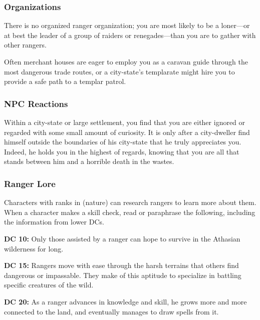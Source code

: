 \subsubsection{Organizations}

There is no organized ranger organization; you are most likely to be a loner---or at best the leader of a group of raiders or renegades---than you are to gather with other rangers.

Often merchant houses are eager to employ you as a caravan guide through the most dangerous trade routes, or a city-state's templarate might hire you to provide a safe path to a templar patrol.

\subsubsection{NPC Reactions}

Within a city-state or large settlement, you find that you are either ignored or regarded with some small amount of curiosity. It is only after a city-dweller find himself outside the boundaries of his city-state that he truly appreciates you. Indeed, he holds you in the highest of regards, knowing that you are all that stands between him and a horrible death in the wastes.

\subsubsection{Ranger Lore}

Characters with ranks in  (nature) can research rangers to learn more about them. When a character makes a skill check, read or paraphrase the following, including the information from lower DCs.

\textbf{DC 10:} Only those assisted by a ranger can hope to survive in the Athasian wilderness for long.

\textbf{DC 15:} Rangers move with ease through the harsh terrains that others find dangerous or impassable. They make of this aptitude to specialize in battling specific creatures of the wild.

\textbf{DC 20:} As a ranger advances in knowledge and skill, he grows more and more connected to the land, and eventually manages to draw spells from it.
